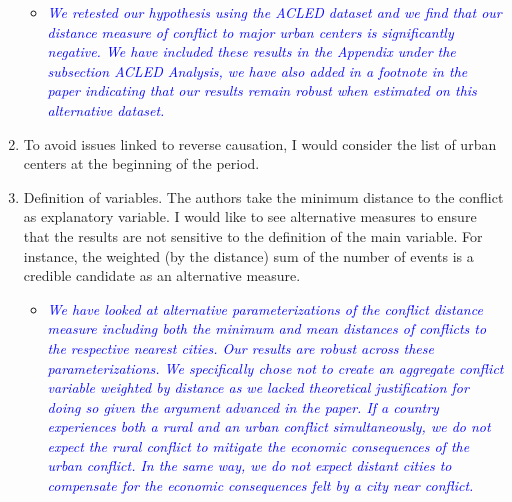 \begin{enumerate}
\begin{itemize}
\item \textcolor{blue}{\emph{
	We retested our hypothesis using the ACLED dataset and we find that our distance measure of conflict to major urban centers is significantly negative. We have included these results in the Appendix under the subsection ACLED Analysis, we have also added in a footnote in the paper indicating that our results remain robust when estimated on this alternative dataset.
}}
\end{itemize}

\item To avoid issues linked to reverse causation, I would consider the list of urban centers at the beginning of the period.


\item Definition of variables. The authors take the minimum distance to the conflict as explanatory variable. I would like to see alternative measures to ensure that the results are not sensitive to the definition of the main variable. For instance, the weighted (by the distance) sum of the number of events is a credible candidate as an alternative measure.

\begin{itemize}
\item \textcolor{blue}{\emph{
	We have looked at alternative parameterizations of the conflict distance measure including both the minimum and mean distances of conflicts to the respective nearest cities. Our results are robust across these parameterizations. We specifically chose not to create an aggregate conflict variable weighted by distance as we lacked theoretical justification for doing so given the argument advanced in the paper. If a country experiences both a rural and an urban conflict simultaneously, we do not expect the rural conflict to mitigate the economic consequences of the urban conflict. In the same way, we do not expect distant cities to compensate for the economic consequences felt by a city near conflict.
}}
\end{itemize}

\end{enumerate}

